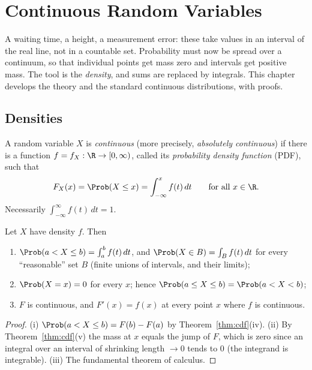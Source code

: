 \chapter{Continuous Random Variables}
\label{ch:cont}

A waiting time, a height, a measurement error: these take values in an interval
of the real line, not in a countable set. Probability must now be spread over a
continuum, so that individual points get mass zero and intervals get positive
mass. The tool is the \emph{density}, and sums are replaced by integrals. This
chapter develops the theory and the standard continuous distributions, with
proofs.

\section{Densities}

\begin{definition}
A random variable $X$ is \emph{continuous} (more precisely, \emph{absolutely
continuous}) if there is a function $f=f_X:\R\to[0,\infty)$, called its
\emph{probability density function} (PDF), such that
\[
F_X(x)=\Prob(X\le x)=\int_{-\infty}^xf(t)\,dt\qquad\text{for all }x\in\R.
\]
Necessarily $\int_{-\infty}^\infty f(t)\,dt=1$.
\end{definition}

\begin{proposition}\label{prop:density}
Let $X$ have density $f$. Then
\begin{enumerate}[label=(\roman*)]
\item $\Prob(a<X\le b)=\int_a^bf(t)\,dt$, and $\Prob(X\in B)=\int_Bf(t)\,dt$ for
every ``reasonable'' set $B$ (finite unions of intervals, and their limits);
\item $\Prob(X=x)=0$ for every $x$; hence $\Prob(a\le X\le b)=\Prob(a<X<b)$;
\item $F$ is continuous, and $F'(x)=f(x)$ at every point $x$ where $f$ is
continuous.
\end{enumerate}
\end{proposition}
\begin{proof}
(i) $\Prob(a<X\le b)=F(b)-F(a)$ by Theorem~\ref{thm:cdf}(iv). (ii) By
Theorem~\ref{thm:cdf}(v) the mass at $x$ equals the jump of $F$, which is zero
since an integral over an interval of shrinking length $\to0$ tends to $0$ (the
integrand is integrable). (iii) The fundamental theorem of calculus.
\end{proof}

